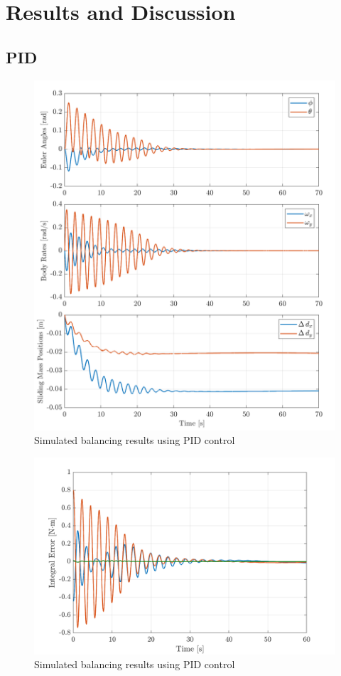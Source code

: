 \chapter{Results and Discussion}

\section{PID}
\begin{figure}[!ht]
    \centering
    \includegraphics[width=\linewidth]{plots/PID_sim_results.png}
    \caption{Simulated balancing results using PID control}
\end{figure}

\begin{figure}[!ht]
    \centering
    \includegraphics[width=\linewidth]{plots/PID_sim_integral_error.png}
    \caption{Simulated balancing results using PID control}
\end{figure}


